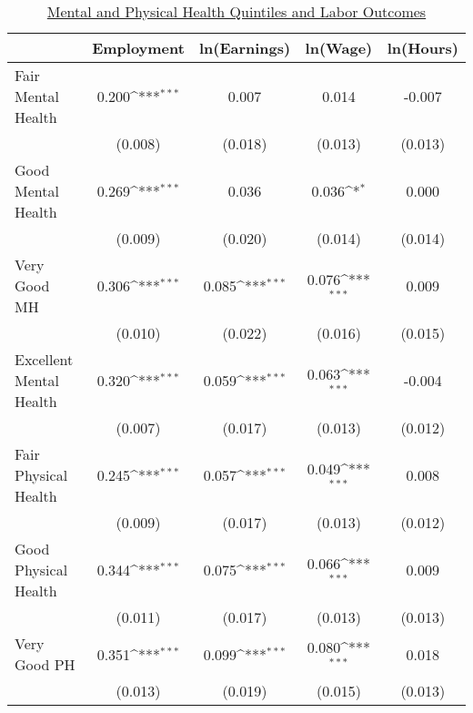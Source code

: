 \documentclass[border=3mm,preview]{standalone}
\begin{document}
\begin{landscape}
\def\sym#1{\ifmmode^{#1}\else\(^{#1}\)\fi}
\begin{table}
\center\caption*{\large{\underline{Mental and Physical Health Quintiles  and Labor Outcomes}}}
\vspace{0.2cm}
\begin{tabular}{l*{4}{c}}
                    &\multicolumn{1}{c}{Employment}&\multicolumn{1}{c}{ln(Earnings)}&\multicolumn{1}{c}{ln(Wage)}&\multicolumn{1}{c}{ln(Hours)}\\
\midrule
Fair Mental Health  &       0.200\sym{***}&       0.007         &       0.014         &      -0.007         \\
                    &     (0.008)         &     (0.018)         &     (0.013)         &     (0.013)         \\
Good Mental Health  &       0.269\sym{***}&       0.036         &       0.036\sym{*}  &       0.000         \\
                    &     (0.009)         &     (0.020)         &     (0.014)         &     (0.014)         \\
Very Good MH        &       0.306\sym{***}&       0.085\sym{***}&       0.076\sym{***}&       0.009         \\
                    &     (0.010)         &     (0.022)         &     (0.016)         &     (0.015)         \\
Excellent Mental Health&       0.320\sym{***}&       0.059\sym{***}&       0.063\sym{***}&      -0.004         \\
                    &     (0.007)         &     (0.017)         &     (0.013)         &     (0.012)         \\
\midrule
Fair Physical Health&       0.245\sym{***}&       0.057\sym{***}&       0.049\sym{***}&       0.008         \\
                    &     (0.009)         &     (0.017)         &     (0.013)         &     (0.012)         \\
Good Physical Health&       0.344\sym{***}&       0.075\sym{***}&       0.066\sym{***}&       0.009         \\
                    &     (0.011)         &     (0.017)         &     (0.013)         &     (0.013)         \\
Very Good PH        &       0.351\sym{***}&       0.099\sym{***}&       0.080\sym{***}&       0.018         \\
                    &     (0.013)         &     (0.019)         &     (0.015)         &     (0.013)         \\

\end{tabular}
\end{table}
\end{landscape}
\end{document}
